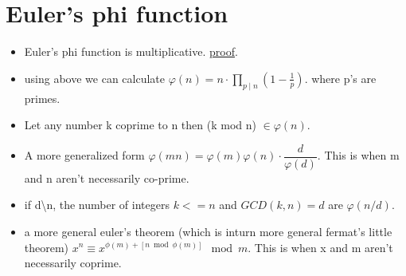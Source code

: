 \documentclass[../Notes.tex]{subfiles}
\begin{document}
\section{Euler's phi function}
\begin{itemize}
	\item Euler's phi function is multiplicative. \href{https://proofwiki.org/w/index.php?title=Euler_Phi_Function_is_Multiplicative&oldid=373969}{proof}.
	\item using above we can calculate $\varphi(n) = n\cdot \prod_{p\mid n}\left(1 - \frac1p\right).$ where p's are primes.
	\item Let any number k coprime to n then (k mod n) $\in \varphi(n)$.
	\item A more generalized form $\varphi (mn) = \varphi (m) \varphi (n) \cdot \dfrac{d}{\varphi (d)}$. This is when m and n aren't necessarily co-prime.
	\item if d\textbackslash n, the number of integers $k<=n$ and $GCD(k,n)=d$ are $\varphi(n/d)$.
	\item a more general euler's theorem (which is inturn more general fermat's little theorem) $x^{n}\equiv x^{\phi(m)+[n \bmod \phi(m)]} \mod m$. This is when x and m aren't necessarily coprime.
\end{itemize}
\end{document}
